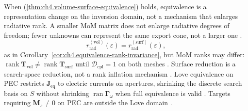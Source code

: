 When (\ref{thm:ch4.volume-surface-equivalence}) holds, equivalence is a representation change on the inversion domain, not a mechanism that enlarges radiative rank. A smaller MoM matrix does not enlarge radiative degrees of freedom; fewer unknowns can represent the same export cone, not a larger one .
\begin{equation}
\label{eq:ch4.equivalence-rank-equality}
r_{\mathrm{rad}}^{\mathrm{(vol)}}(\varepsilon)
=
r_{\mathrm{rad}}^{\mathrm{(surf)}}(\varepsilon),
\end{equation}
as in Corollary~\ref{cor:ch4.equivalence-rank-invariance}, but MoM ranks may differ:
\(\operatorname{rank}\mathbf{T}_{\mathrm{vol}}\neq\operatorname{rank}\mathbf{T}_{\mathrm{surf}}\) until
\(\mathcal{D}_{\mathrm{cpl}}=1\) on both meshes . Surface reduction is a
search-space reduction, not a rank inflation mechanism .
\label{prop:ch4.love-reduction-domain}
Love equivalence on PEC restricts \(\mathbf{J}_{\mathrm{eq}}\) to electric currents on apertures, shrinking the discrete
search basis on \(S\) without shrinking \(\operatorname{ran}\boldsymbol{\Gamma}_\omega\) when full equivalence is valid
. Targets requiring \(\mathbf{M}_{s}\neq0\) on PEC are outside the Love
domain .
